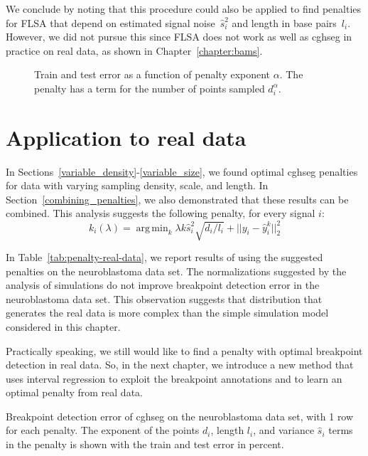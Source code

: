 \documentclass{jsfds} %
\newcommand{\fig}[3][H]{
  \begin{figure}[#1]
    \hskip -1cm
    
    \caption{#3}
    \label{fig:#2}
  \end{figure}
}
\newcommand{\tab}[3][H]{
  \begin{table}[#1]
    \centering
    
    \caption{#3}
    \label{tab:#2}
  \end{table}
}
\DeclareMathOperator*{\argmin}{arg\,min}
\begin{document}
We conclude by noting that this procedure could also be applied to
find penalties for FLSA that depend on estimated signal noise~$\hat
s_i^2$ and length in base pairs~$l_i$. However, we did not pursue this
since FLSA does not work as well as cghseg in practice on real data,
as shown in Chapter~\ref{chapter:bams}.

\fig{variable-density-error-alpha-flsa}{Train and test error as a
  function of penalty exponent $\alpha$. The penalty has a term for
  the number of points sampled $d_i^\alpha$.}


\newpage

\section{Application to real data}

In Sections~\ref{variable_density}-\ref{variable_size}, we found
optimal cghseg penalties for data with varying sampling density,
scale, and length. In Section~\ref{combining_penalties}, we also
demonstrated that these results can be combined. This analysis
suggests the following penalty, for every signal $i$:
\begin{equation}
  \label{eq:composite_penalty}
  k_i(\lambda) = 
  \argmin_k
  \lambda k \hat s_i^2 \sqrt{d_i/l_i}  +
  ||y_i - \hat y_i^k||^2_2
\end{equation}

In Table~\ref{tab:penalty-real-data}, we report results of using the
suggested penalties on the neuroblastoma data set. The normalizations
suggested by the analysis of simulations do not improve breakpoint
detection error in the neuroblastoma data set. This observation
suggests that distribution that generates the real data is more
complex than the simple simulation model considered in this chapter.

Practically speaking, we still would like to find a penalty with
optimal breakpoint detection in real data. So, in the next chapter, we
introduce a new method that uses interval regression to exploit the
breakpoint annotations and to learn an optimal penalty from real data.

\tab{penalty-real-data}{Breakpoint detection error of cghseg on the
  neuroblastoma data set, with 1 row for each penalty. The exponent of
  the points $d_i$, length $l_i$, and variance $\hat s_i$ terms in the
  penalty is shown with the train and test error in percent. }

%

\end{document}
